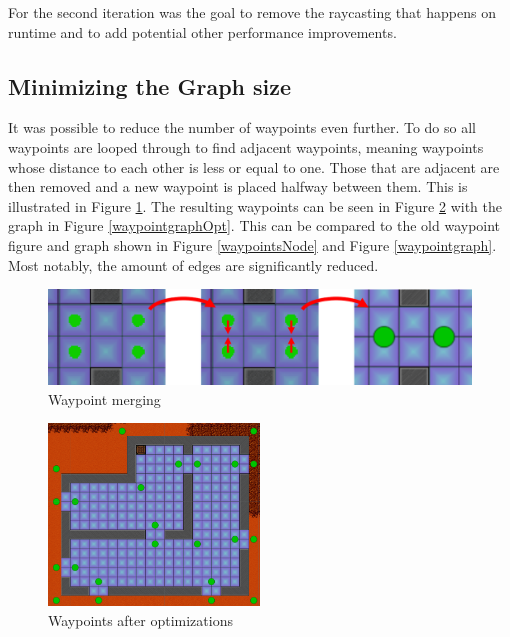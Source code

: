 For the second iteration was the goal to remove the raycasting that happens on runtime and to add potential other performance improvements.

\subsection*{Minimizing the Graph size}
It was possible to reduce the number of waypoints even further.
To do so all waypoints are looped through to find adjacent waypoints, meaning waypoints whose distance to each other is less or equal to one.
Those that are adjacent are then removed and a new waypoint is placed halfway between them.
This is illustrated in Figure \ref{waypointMerge}.
The resulting waypoints can be seen in Figure \ref{waypointOpt} with the graph in Figure \ref{waypointgraphOpt}. 
This can be compared to the old waypoint figure and graph shown in Figure \ref{waypointsNode} and Figure \ref{waypointgraph}.
Most notably, the amount of edges are significantly reduced.
\begin{figure}[H]
	\includegraphics[width=\textwidth]{figures/astar/waypointMerge}
	\caption{Waypoint merging}
	\label{waypointMerge}
\end{figure}

\begin{figure}[H]
\begin{center}

	\includegraphics[width=0.5\textwidth]{figures/astar/optimizedWaypoints}
	\caption{Waypoints after optimizations}
	\label{waypointOpt}
\end{center}
\end{figure}

